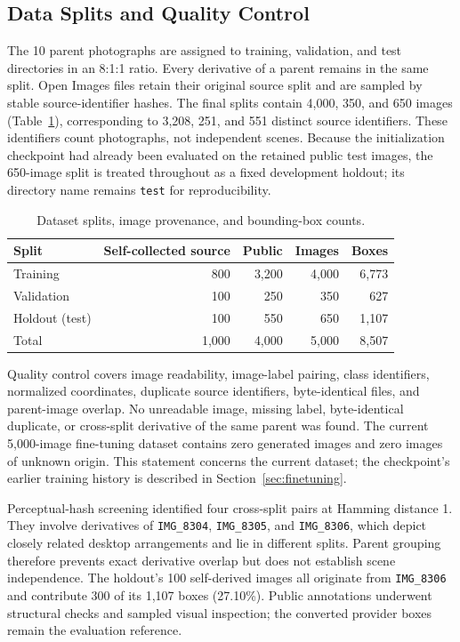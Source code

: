 \documentclass[12pt,a4paper]{article}
\begin{document}
\subsection{Data Splits and Quality Control}

The 10 parent photographs are assigned to training, validation, and test directories in an 8:1:1 ratio. Every derivative of a parent remains in the same split. Open Images files retain their original source split and are sampled by stable source-identifier hashes. The final splits contain 4,000, 350, and 650 images (Table~\ref{tab:split}), corresponding to 3,208, 251, and 551 distinct source identifiers. These identifiers count photographs, not independent scenes. Because the initialization checkpoint had already been evaluated on the retained public test images, the 650-image split is treated throughout as a fixed development holdout; its directory name remains \texttt{test} for reproducibility.

\begin{table}[htbp]
\caption{Dataset splits, image provenance, and bounding-box counts.}
\label{tab:split}
\centering
\small
\begin{tabular}{lrrrr}
\toprule
Split & Self-collected source & Public & Images & Boxes \\
\midrule
Training & 800 & 3,200 & 4,000 & 6,773 \\
Validation & 100 & 250 & 350 & 627 \\
Holdout (test) & 100 & 550 & 650 & 1,107 \\
\midrule
Total & 1,000 & 4,000 & 5,000 & 8,507 \\
\bottomrule
\end{tabular}
\end{table}

Quality control covers image readability, image-label pairing, class identifiers, normalized coordinates, duplicate source identifiers, byte-identical files, and parent-image overlap. No unreadable image, missing label, byte-identical duplicate, or cross-split derivative of the same parent was found. The current 5,000-image fine-tuning dataset contains zero generated images and zero images of unknown origin. This statement concerns the current dataset; the checkpoint's earlier training history is described in Section~\ref{sec:finetuning}.

Perceptual-hash screening identified four cross-split pairs at Hamming distance 1. They involve derivatives of \texttt{IMG\_8304}, \texttt{IMG\_8305}, and \texttt{IMG\_8306}, which depict closely related desktop arrangements and lie in different splits. Parent grouping therefore prevents exact derivative overlap but does not establish scene independence. The holdout's 100 self-derived images all originate from \texttt{IMG\_8306} and contribute 300 of its 1,107 boxes (27.10\%). Public annotations underwent structural checks and sampled visual inspection; the converted provider boxes remain the evaluation reference.
\end{document}
